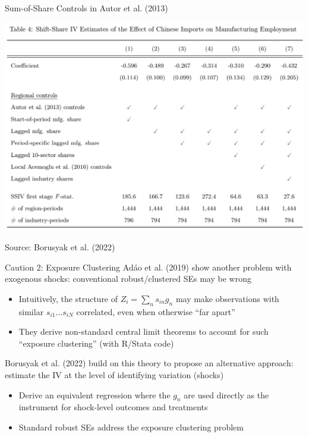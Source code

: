 \documentclass{beamer}
\begin{document}
\begin{frame}{Sum-of-Share Controls in Autor et al. (2013)}
\vspace{-0.3cm}
\begin{center}
\includegraphics[scale=0.4]{./lecture_includes/adh_bhj.png}
\end{center}
\vspace{-0.3cm}
Source: Borusyak et al. (2022)
\end{frame}

\begin{frame}{Caution 2: Exposure Clustering}
Ad\'{a}o et al. (2019) show another problem with exogenous shocks: conventional robust/clustered SEs may be wrong \smallskip
\begin{itemize}
\item Intuitively, the structure of $Z_{i}=\sum_n s_{in}g_n$ may make observations with similar $s_{i1}\dots s_{iN}$ correlated, even when otherwise ``far apart''\smallskip
\item They derive non-standard central limit theorems to account for such ``exposure clustering'' (with R/Stata code)
\end{itemize}\medskip\pause{}
Borusyak et al. (2022) build on this theory to propose an alternative approach: estimate the IV at the level of identifying variation (shocks)\smallskip
\begin{itemize}
\item Derive an equivalent regression where the $g_n$ are used directly as the instrument for shock-level outcomes and treatments\smallskip
\item Standard robust SEs address the exposure clustering problem
\end{itemize}

\end{frame}
\end{document}

